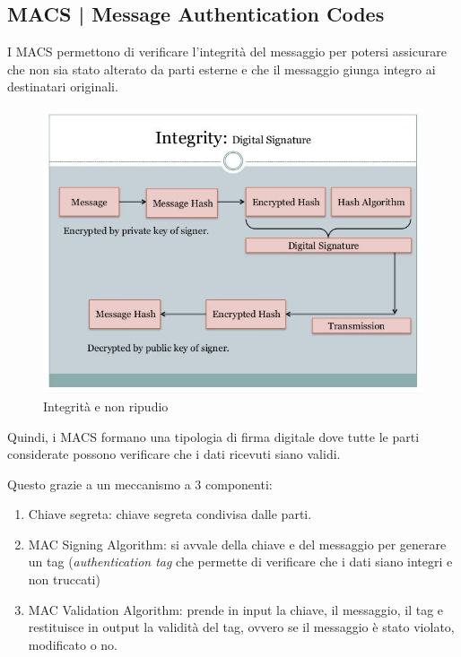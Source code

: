 
\subsection{MACS | Message Authentication Codes}

 

\textsf{\small I MACS permettono di verificare l'integrità del messaggio per potersi assicurare che non sia stato alterato da parti esterne e che il messaggio giunga integro ai destinatari originali.} %

\begin{figure}[H]
	\centering
	\includegraphics[width=.9\textwidth, height=.9\textheight, keepaspectratio]{./images/aes_modes/encryption-integrity-and-nonrepudiation.png}
	\caption{Integrità e non ripudio}
	\label{fig:encryption-integrity-and-nonrepudiation}
\end{figure}


\textsf{\small Quindi, i MACS formano una tipologia di firma digitale dove tutte le parti considerate possono verificare che i dati ricevuti siano validi.}

\textsf{\small Questo grazie a un meccanismo a 3 componenti:}

\begin{enumerate}
	\item \textsf{\small Chiave segreta: chiave segreta condivisa dalle parti.}
	\item \textsf{\small MAC Signing Algorithm: si avvale della chiave e del messaggio per generare un tag (\emph{authentication tag} che permette di verificare che i dati siano integri e non truccati)}
	\item \textsf{\small MAC Validation Algorithm: prende in input la chiave, il messaggio, il tag e restituisce in output la validità del tag, ovvero se il messaggio è stato violato, modificato o no.}
\end{enumerate}

